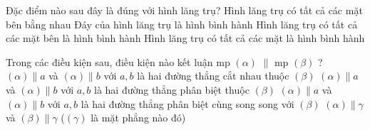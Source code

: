 \begin{ex}%
	Đặc điểm nào sau đây là đúng với hình lăng trụ?
	\choice
	{Hình lăng trụ có tất cả các mặt bên bằng nhau}
	{Đáy của hình lăng trụ là hình bình hành}
	{\True Hình lăng trụ có tất cả các mặt bên là hình bình hành}
	{Hình lăng trụ có tất cả các mặt là hình bình hành}
\end{ex}
\begin{ex}%
	Trong các điều kiện sau, điều kiện nào kết luận mp $\left(\alpha\right)$ $\parallel$ mp $\left(\beta\right)$ ?
	\choice
	{\True $\left(\alpha\right)\parallel a$ và $\left(\alpha\right)\parallel b$ với $a, b$ là hai đường thẳng cắt nhau thuộc $\left(\beta\right)$}
	{$\left(\alpha\right)\parallel a$ và $\left(\alpha\right)\parallel b$ với $a, b$ là hai đường thẳng phân biệt thuộc $\left(\beta\right)$}
	{$\left(\alpha\right)\parallel a$ và $\left(\alpha\right)\parallel b$ với $a, b$ là hai đường thẳng phân biệt cùng song song với $\left(\beta\right)$}
	{$\left(\alpha\right)\parallel \gamma$ và $\left(\beta\right)\parallel \gamma$ ($\left(\gamma\right)$ là mặt phẳng nào đó)}
\end{ex}
